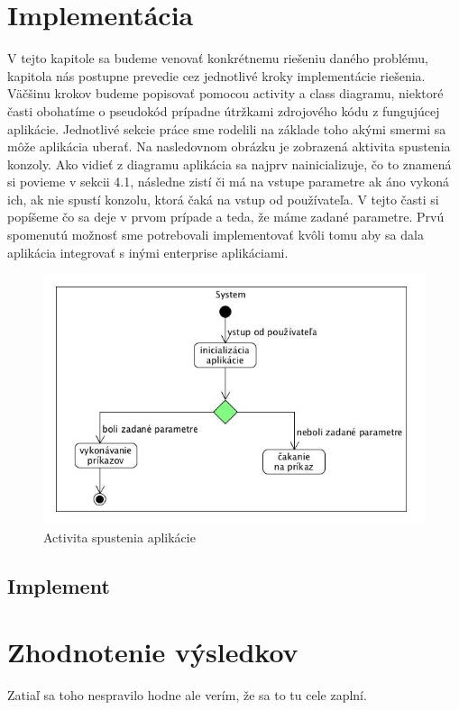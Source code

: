\section{Implementácia}
\indent V tejto kapitole sa budeme venovať konkrétnemu riešeniu daného problému, kapitola nás postupne prevedie cez jednotlivé kroky implementácie riešenia. Väčšinu krokov budeme popisovať pomocou activity a class diagramu, niektoré časti obohatíme o pseudokód prípadne útržkami zdrojového kódu z fungujúcej aplikácie. Jednotlivé sekcie práce sme rodelili na základe toho akými smermi sa môže aplikácia uberať. Na nasledovnom obrázku je zobrazená aktivita spustenia konzoly. Ako vidieť z diagramu aplikácia sa najprv nainicializuje, čo to znamená si povieme v sekcii 4.1, následne zistí či má na vstupe parametre ak áno vykoná ich, ak nie spustí konzolu, ktorá čaká na vstup od používateľa. V tejto časti si popíšeme čo sa deje v prvom prípade a teda, že máme zadané parametre. 
\newline 
\indent Prvú spomenutú možnosť sme potrebovali implementovať kvôli tomu aby sa dala aplikácia integrovať s inými enterprise aplikáciami. 
\begin{figure}[!htbp]
	\centering
	\includegraphics[width=\linewidth]{img/System.jpg}
	\caption{Activita spustenia aplikácie}
	\label{fig:test}
\end{figure}
\subsection{Implement}
\indent 
\section{Zhodnotenie výsledkov}
Zatiaľ sa toho nespravilo hodne ale verím, že sa to tu cele zaplní.